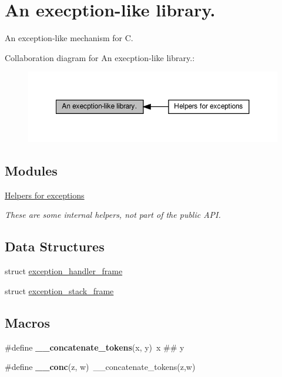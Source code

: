 \hypertarget{group__exceptions}{}\section{An execption-\/like library.}
\label{group__exceptions}


An exception-\/like mechanism for C.  


Collaboration diagram for An execption-\/like library.\+:\nopagebreak
\begin{figure}[H]
\begin{center}
\leavevmode
\includegraphics[width=350pt]{group__exceptions}
\end{center}
\end{figure}
\subsection*{Modules}
\begin{DoxyCompactItemize}
\item 
\hyperlink{group__helpers}{Helpers for exceptions}
\begin{DoxyCompactList}\small\item\em These are some internal helpers, not part of the public A\+PI. \end{DoxyCompactList}\end{DoxyCompactItemize}
\subsection*{Data Structures}
\begin{DoxyCompactItemize}
\item 
struct \hyperlink{structexception__handler__frame}{exception\+\_\+handler\+\_\+frame}
\item 
struct \hyperlink{structexception__stack__frame}{exception\+\_\+stack\+\_\+frame}
\end{DoxyCompactItemize}
\subsection*{Macros}
\begin{DoxyCompactItemize}
\item 
\mbox{\label{group__exceptions_gadf8cc03bd0ede7f3e5aafa57de5016dd}} 
\#define {\bfseries \+\_\+\+\_\+concatenate\+\_\+tokens}(x,  y)~x \#\# y
\item 
\mbox{\label{group__exceptions_ga0d2e02c74b05d3ff3bfa9eb3dcd891e3}} 
\#define {\bfseries \+\_\+\+\_\+conc}(z,  w)~\+\_\+\+\_\+concatenate\+\_\+tokens(z,w)
\end{DoxyCompactItemize}
